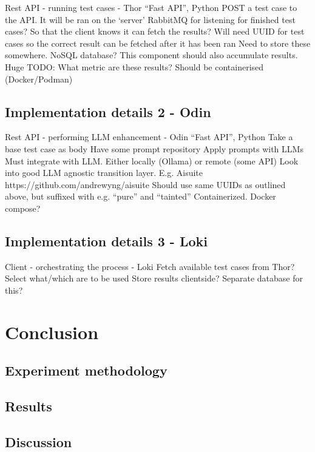 \documentclass[UKenglish]{uiomasterthesis}  %
\begin{document}
Rest API - running test cases - Thor
“Fast API”, Python
POST a test case to the API. It will be ran on the ‘server’
RabbitMQ for listening for finished test cases? So that the client knows it can fetch the results?
Will need UUID for test cases so the correct result can be fetched after it has been ran
Need to store these somewhere. NoSQL database?
This component should also accumulate results.
Huge TODO: What metric are these results?
Should be containerised (Docker/Podman)

\chapter{Implementation details 2 - Odin}

Rest API - performing LLM enhancement - Odin
“Fast API”, Python
Take a base test case as body
Have some prompt repository
Apply prompts with LLMs
Must integrate with LLM. Either locally (Ollama) or remote (some API)
Look into good LLM agnostic transition layer. E.g. Aisuite
https://github.com/andrewyng/aisuite
Should use same UUIDs as outlined above, but suffixed with e.g. “pure” and “tainted”
Containerized. Docker compose?

\chapter{Implementation details 3 - Loki}

Client - orchestrating the process - Loki
Fetch available test cases from Thor? Select what/which are to be used
Store results clientside? Separate database for this?

\part{Conclusion}
\chapter{Experiment methodology}
\chapter{Results}
\chapter{Discussion}


\backmatter{}
\printbibliography{}
\end{document}
